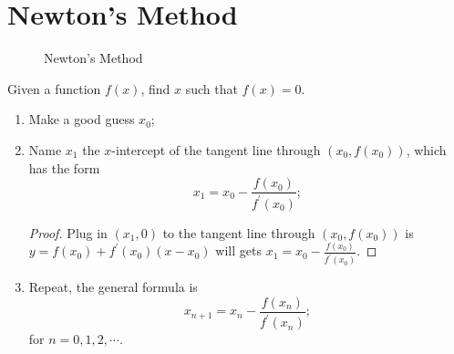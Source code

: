 \section{Newton's Method}
\begin{figure}[H]
  \centering
  \caption{Newton's Method}
\end{figure}
Given a function $f(x)$, find $x$ such that $f(x)=0$.
\begin{enumerate}
\item Make a good guess $x_0$;
\item Name $x_1$ the $x$-intercept of the tangent line through $(x_0,f(x_0))$, which has the form
  \[\boxed{x_1=x_0-\frac{f(x_0)}{f^\prime(x_0)};}\]
  \begin{proof}
    Plug in $(x_1, 0)$ to the tangent line through $(x_0, f(x_0))$ is $y=f(x_0)+f^\prime(x_0)(x-x_0)$ will gets $x_1=x_0-\frac{f(x_0)}{f^\prime(x_0)}$.
  \end{proof}
\item Repeat, the general formula is
  \[\boxed{x_{n+1}=x_n-\frac{f(x_n)}{f^\prime(x_n)};}\]
  for $n=0,1,2,\cdots$.
\end{enumerate}
